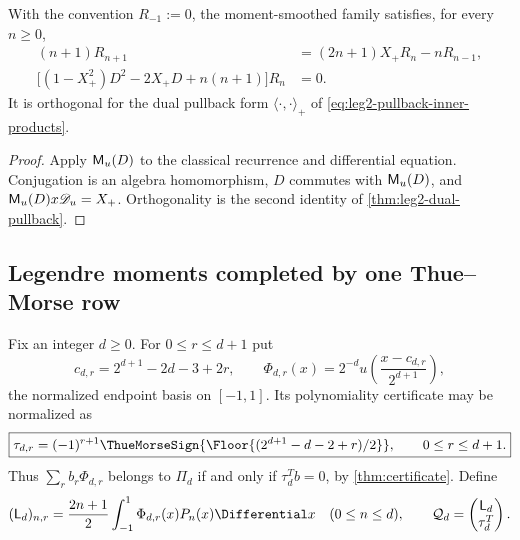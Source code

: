 \begin{corollary}
\label{cor:leg2-R-transmutation}
With the convention $R_{-1}:=0$, the moment-smoothed family satisfies, for
every $n\ge0$,
\begin{align}
 (n+1)R_{n+1}&=(2n+1)X_+R_n-nR_{n-1},
 \label{eq:leg2-R-recurrence}\\
 \bigl[(1-X_+^2)D^2-2X_+D+n(n+1)\bigr]R_n&=0.
 \label{eq:leg2-R-differential}
\end{align}
It is orthogonal for the dual pullback form $\langle\cdot,\cdot\rangle_+$ of
\eqref{eq:leg2-pullback-inner-products}.
\end{corollary}

\begin{proof}
Apply $\mathsf M_u(D)$ to the classical recurrence and differential equation.
Conjugation is an algebra homomorphism, $D$ commutes with $\mathsf M_u(D)$, and
$\mathsf M_u(D)x\mathscr D_u=X_+$.  Orthogonality is the second identity of
\cref{thm:leg2-dual-pullback}.
\end{proof}

\subsection{Legendre moments completed by one Thue--Morse row}

Fix an integer $d\ge0$.  For $0\le r\le d+1$ put
\begin{equation}
 c_{d,r}=2^{d+1}-2d-3+2r,
 \qquad
 \Phi_{d,r}(x)=2^{-d}u\!\left(\frac{x-c_{d,r}}{2^{d+1}}\right),
 \label{eq:leg2-endpoint-atoms}
\end{equation}
the normalized endpoint basis on $[-1,1]$.  Its polynomiality certificate may
be normalized as
\begin{equation}
 \boxed{\tau_{d,r}=(-1)^{r+1}
 \ThueMorseSign{\Floor{(2^{d+1}-d-2+r)/2}},
 \qquad 0\le r\le d+1.}
 \label{eq:leg2-tau-row}
\end{equation}
Thus $\sum_rb_r\Phi_{d,r}$ belongs to $\Pi_d$ if and only if
$\tau_d^Tb=0$, by \cref{thm:certificate}.  Define
\begin{equation}
 (\mathsf L_d)_{n,r}=
 \frac{2n+1}{2}\int_{-1}^{1}\Phi_{d,r}(x)P_n(x)\Differential x
 \quad(0\le n\le d),
 \qquad
 \mathcal Q_d=\begin{pmatrix}\mathsf L_d\\\tau_d^T\end{pmatrix}.
 \label{eq:leg2-augmented-moment}
\end{equation}

